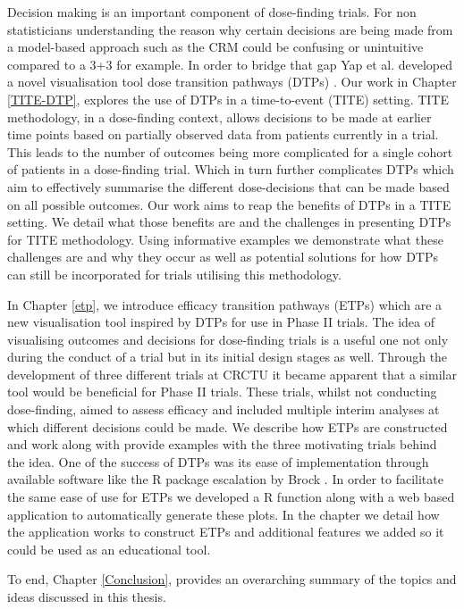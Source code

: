 Decision making is an important component of dose-finding trials. For non statisticians understanding the reason why certain decisions are being made from a model-based approach such as the CRM could be confusing or unintuitive compared to a 3+3 for example. In order to bridge that gap Yap et al.  developed a novel visualisation tool dose transition pathways (DTPs) \cite{yapDoseTransitionPathways2017}. Our work in Chapter \ref{TITE-DTP}, explores the use of DTPs in a time-to-event (TITE) setting. TITE methodology, in a dose-finding context, allows decisions to be made at earlier time points based on partially observed data from patients currently in a trial. This leads to the number of outcomes being more complicated for a single cohort of patients in a dose-finding trial. Which in turn further complicates DTPs which aim to effectively summarise the different dose-decisions that can be made based on all possible outcomes. Our work aims to reap the benefits of DTPs in a TITE setting. We detail what those benefits are and the challenges in presenting DTPs for TITE methodology. Using informative examples we demonstrate what these challenges are and why they occur as well as potential solutions for how DTPs can still be incorporated for trials utilising this methodology. 

In Chapter \ref{etp}, we introduce efficacy transition pathways (ETPs) which are a new visualisation tool inspired by DTPs for use in Phase \RN{2} trials. The idea of visualising outcomes and decisions for dose-finding trials is a useful one not only during the conduct of a trial but in its initial design stages as well. Through the development of three different trials at CRCTU it became apparent that a similar tool would be beneficial for Phase \RN{2} trials. These trials, whilst not conducting dose-finding, aimed to assess efficacy and included multiple interim analyses at which different decisions could be made. We describe how ETPs are constructed and work along with provide examples with the three motivating trials behind the idea. One of the success of DTPs was its ease of implementation through available software like the R package escalation by Brock \cite{brockModularApproachDose2020}. In order to facilitate the same ease of use for ETPs we developed a R function along with a web based application to automatically generate these plots. In the chapter we detail how the application works to construct ETPs and additional features we added so it could be used as an educational tool. 

To end, Chapter \ref{Conclusion}, provides an overarching summary of the topics and ideas discussed in this thesis. 



